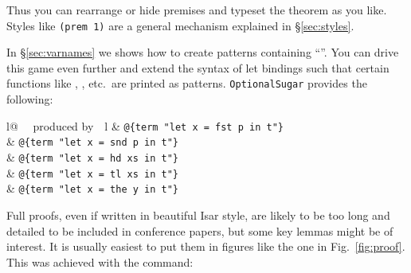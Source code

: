 \begin{isabellebody}
\begin{isamarkuptext}
\begin{quote}
\end{quote}
Thus you can rearrange or hide premises and typeset the theorem as you like.
Styles like \verb!(prem 1)! are a general mechanism explained
in \S\ref{sec:styles}.%
\end{isamarkuptext}%
\isamarkuptrue%
%
\isamarkuptrue%
%
\begin{isamarkuptext}%
In \S\ref{sec:varnames} we shows how to create patterns containing
  ``\isa{\_}''.
  You can drive this game even further and extend the syntax of let
  bindings such that certain functions like , , 
  etc.\ are printed as patterns. \texttt{OptionalSugar} provides the
  following:
  
  \begin{center}
  \begin{tabular}{l@ {~~produced by~~}l}
   & \verb!@!\verb!{term "let x = fst p in t"}!\\
   & \verb!@!\verb!{term "let x = snd p in t"}!\\
   & \verb!@!\verb!{term "let x = hd xs in t"}!\\
   & \verb!@!\verb!{term "let x = tl xs in t"}!\\
   & \verb!@!\verb!{term "let x = the y in t"}!\\
  \end{tabular}
  \end{center}%
\end{isamarkuptext}%
\isamarkuptrue%
%
\isamarkuptrue%
%
\begin{isamarkuptext}%
Full proofs, even if written in beautiful Isar style, are
likely to be too long and detailed to be included in conference
papers, but some key lemmas might be of interest.
It is usually easiest to put them in figures like the one in Fig.\
\ref{fig:proof}. This was achieved with the  command:%
\end{isamarkuptext}%
\isamarkuptrue%
%
\begin{figure}
  \begin{center}\begin{minipage}{0.6\textwidth}  

\end{minipage}
\end{center}
\end{figure}
\end{isabellebody}
